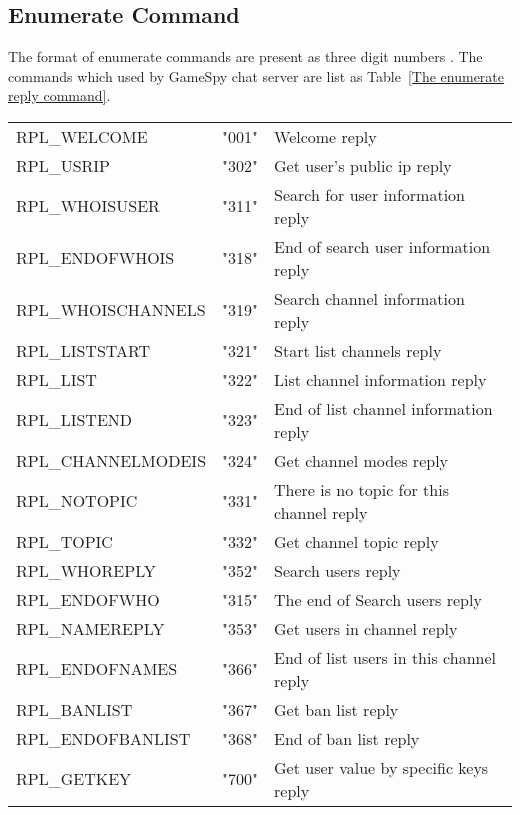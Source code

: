 \documentclass[oneside,titlepage,a4paper]{Definition/retrospy} %
\begin{document}
\subsection{Enumerate Command}
The format of enumerate commands are present as three digit numbers . The commands which used by GameSpy chat server are list as Table~\ref{The enumerate reply command}.
\begin{table}[H]
	\centering
	\begin{longtable}{|p{4.5cm}|l|p{4.5cm}|}
		\hline 		\tbf{Name}&\tbf{Value}&\tbf{Description}\\
		\hline
		RPL\_WELCOME&"001"&Welcome reply\\
		\hline
		RPL\_USRIP           &        "302"&Get user's public ip reply\\\hline
		RPL\_WHOISUSER        &       "311"&Search for user information reply\\\hline
		RPL\_ENDOFWHOIS         &     "318"&End of search user information reply\\\hline
		RPL\_WHOISCHANNELS     &      "319"&Search channel information reply\\\hline
		RPL\_LISTSTART         &      "321"&Start list channels reply\\\hline
		RPL\_LIST               &     "322"&List channel information reply\\\hline
		RPL\_LISTEND       &          "323"&End of list channel information reply\\\hline
		RPL\_CHANNELMODEIS     &      "324"&Get channel modes reply\\\hline
		RPL\_NOTOPIC     &            "331"&There is no topic for this channel reply\\\hline
		RPL\_TOPIC              &     "332"&Get channel topic reply\\\hline
		RPL\_WHOREPLY        &        "352"&Search users reply\\\hline
		RPL\_ENDOFWHO          &      "315"&The end of Search users reply\\\hline
		RPL\_NAMEREPLY         &      "353"&Get users in channel reply\\\hline
		RPL\_ENDOFNAMES     &         "366"&End of list users in this channel reply\\\hline
		RPL\_BANLIST              &   "367"&Get ban list reply\\\hline
		RPL\_ENDOFBANLIST      &      "368"&End of ban list reply\\\hline
		RPL\_GETKEY              &    "700"&Get user value by specific keys reply\\\hline

\end{longtable}
\end{table}
\end{document}

